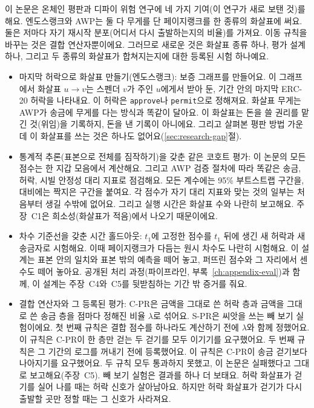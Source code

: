 이 논문은 온체인 평판과 디파이 위험 연구에 네 가지 기여(이 연구가 새로 보탠 것)를 해요. 엔도스랭크와 AWP는 둘 다 무게를 단 페이지랭크를 한 종류의 화살표에 써요. 둘은 저마다 자기 재시작 분포(어디서 다시 출발하는지의 비율)를 가져요. 이동 규칙을 바꾸는 것은 결합 연산자뿐이에요. 그러므로 새로운 것은 화살표 종류 하나, 평가 설계 하나, 그리고 두 종류의 화살표가 합쳐지는지에 대한 등록된 시험 하나예요.
\begin{itemize}
\item 마지막 허락으로 화살표 만들기(엔도스랭크): 보증 그래프를 만들어요. 이 그래프에서 화살표 $u \to v$는 스펜더 $v$가 주인 $u$에게서 받아 둔, 기간 안의 마지막 ERC-20 허락을 나타내요. 이 허락은 \texttt{approve}나 \texttt{permit}으로 정해져요. 화살표 무게는 AWP가 송금에 무게를 다는 방식과 똑같이 달아요. 이 화살표는 돈을 쓸 권리를 맡긴 것(위임)을 기록하지, 돈을 낸 기록이 아니에요. 그리고 살펴본 평판 방법 가운데 이 화살표를 쓰는 것은 하나도 없어요(\ref{sec:research-gap}절).
\item 통계적 추론(표본으로 전체를 짐작하기)을 갖춘 같은 코호트 평가: 이 논문의 모든 점수는 한 지갑 모음에서 계산해요. 그리고 AWP 검증 절차에 따라 똑같은 송금, 허락, 시빌 안정성 대리 지표로 점검해요. 모든 계수에는 95\% 부트스트랩 구간을, 대비에는 짝지은 구간을 붙여요. 각 점수가 자기 대리 지표와 맞는 것의 일부는 처음부터 생길 수밖에 없어요. 그리고 실행 시간은 화살표 수와 나란히 보고해요. 주장~C1은 희소성(화살표가 적음)에서 나오기 때문이에요.
\item 차수 기준선을 갖춘 시간 홀드아웃: $t_1$에 고정한 점수를 $t_1$ 뒤에 생긴 새 허락과 새 송금자로 시험해요. 이때 페이지랭크가 다듬는 원시 차수도 나란히 시험해요. 이 설계는 표본 안의 일치와 표본 밖의 예측을 떼어 놓고, 퍼뜨린 점수와 그 자리에서 센 수도 떼어 놓아요. 공개된 처리 과정(파이프라인, 부록~\ref{ch:appendix-eval})과 함께, 이 설계는 주장~C4와~C5를 뒷받침하는 기간 밖 증거를 줘요.
\item 결합 연산자와 그 등록된 평가: C-PR은 금액을 그대로 쓴 허락 층과 금액을 그대로 쓴 송금 층을 점마다 정해진 비율 $\lambda$로 섞어요. S-PR은 씨앗을 쓰는 빼 보기 실험이에요. 첫 번째 규칙은 결합 점수를 하나라도 계산하기 전에 $\lambda$와 함께 정했어요. 이 규칙은 C-PR이 한 층만 걷는 두 걷기를 모두 이기기를 요구했어요. 두 번째 규칙은 그 기간의 로그를 꺼내기 전에 등록했어요. 이 규칙은 C-PR이 송금 걷기보다 나아지기를 요구했어요. 두 규칙 모두 통과하지 못했고, 이 논문은 실패했다고 그대로 보고해요(주장~C5). 빼 보기 실험은 결과를 하나 더 보태요. 허락 화살표가 걷기를 실어 나를 때는 허락 신호가 살아남아요. 하지만 허락 화살표가 걷기가 다시 출발할 곳만 정할 때는 그 신호가 사라져요.
\end{itemize}


